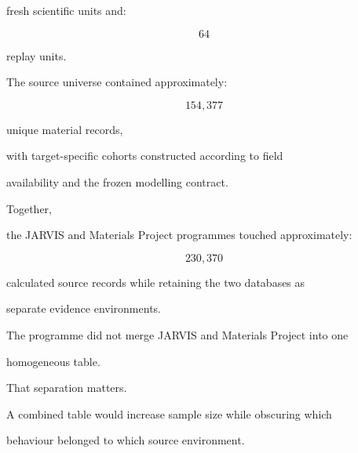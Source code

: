 \documentclass[11pt,a4paper,oneside]{report}
\begin{document}
fresh scientific units and:



\begin{equation}
64
\end{equation}



replay units.



The source universe contained approximately:



\begin{equation}
154{,}377
\end{equation}



unique material records,

with target-specific cohorts constructed according to field

availability and the frozen modelling contract.



Together,

the JARVIS and Materials Project programmes touched approximately:



\begin{equation}
230{,}370
\end{equation}



calculated source records while retaining the two databases as

separate evidence environments.



The programme did not merge JARVIS and Materials Project into one

homogeneous table.



That separation matters.



A combined table would increase sample size while obscuring which

behaviour belonged to which source environment.
\end{document}
